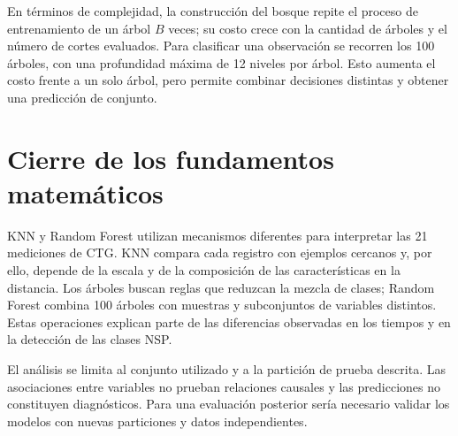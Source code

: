 En t\'erminos de complejidad, la construcci\'on del bosque repite el proceso de entrenamiento de un \'arbol $B$ veces; su costo crece con la cantidad de \'arboles y el n\'umero de cortes evaluados. Para clasificar una observaci\'on se recorren los 100 \'arboles, con una profundidad m\'axima de 12 niveles por \'arbol. Esto aumenta el costo frente a un solo \'arbol, pero permite combinar decisiones distintas y obtener una predicci\'on de conjunto.

\section{Cierre de los fundamentos matem\'aticos}
KNN y Random Forest utilizan mecanismos diferentes para interpretar las 21 mediciones de CTG. KNN compara cada registro con ejemplos cercanos y, por ello, depende de la escala y de la composici\'on de las caracter\'isticas en la distancia. Los \'arboles buscan reglas que reduzcan la mezcla de clases; Random Forest combina 100 \'arboles con muestras y subconjuntos de variables distintos. Estas operaciones explican parte de las diferencias observadas en los tiempos y en la detecci\'on de las clases NSP.

El an\'alisis se limita al conjunto utilizado y a la partici\'on de prueba descrita. Las asociaciones entre variables no prueban relaciones causales y las predicciones no constituyen diagn\'osticos. Para una evaluaci\'on posterior ser\'ia necesario validar los modelos con nuevas particiones y datos independientes.

\balance
\printbibliography[title={Referencias}]

